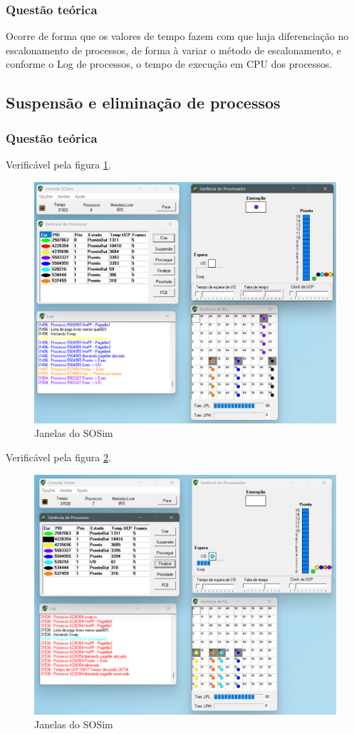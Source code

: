 \documentclass[a4paper,12pt]{article} %
\begin{document}
\subsubsection[]{Questão teórica}
Ocorre de forma que os valores de tempo fazem com que haja diferenciação no escalonamento de processos, de forma à variar
o método de escalonamento, e conforme o Log de processos, o tempo de execução em CPU dos processos.
\subsection[]{Suspensão e eliminação de processos}
\subsubsection[]{Questão teórica}
Verificável pela figura \ref{fig9}.
\begin{figure}[htbp]
    \centering
    \includegraphics[scale=0.4]{../fig/fig9.png}
    \caption{Janelas do SOSim}
    \label{fig9}
\end{figure}

Verificável pela figura \ref{fig10}.
\begin{figure}[htbp]
    \centering
    \includegraphics[scale=0.4]{../fig/fig10.png}
    \caption{Janelas do SOSim}
    \label{fig10}
\end{figure}
\end{document}
